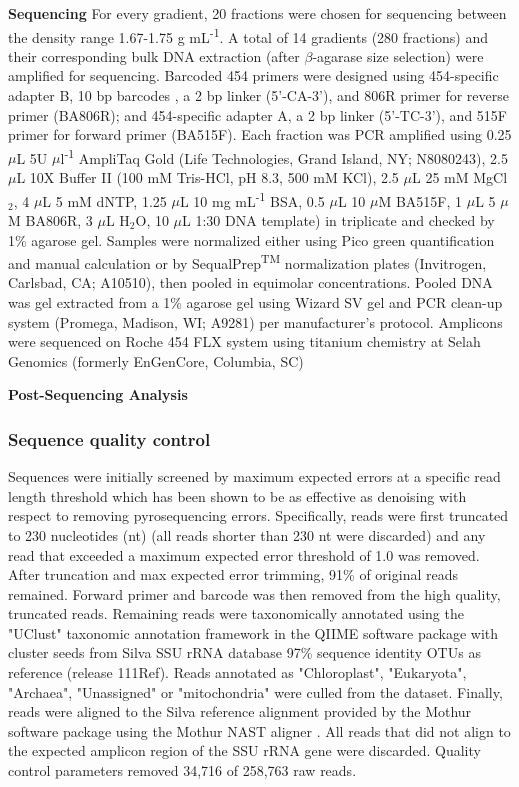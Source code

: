 \textbf{Sequencing}  For every gradient, 20 fractions were chosen for sequencing between the density range 1.67-1.75 g mL\textsuperscript{-1}. A total of 14 gradients (280 fractions) and their corresponding bulk DNA extraction (after $\beta$-agarase size selection) were amplified for sequencing. Barcoded 454 primers were designed using 454-specific adapter B, 10 bp barcodes \cite{Hamady_2008}, a 2 bp linker (5'-CA-3'), and 806R primer for reverse primer (BA806R); and 454-specific adapter A, a 2 bp linker (5'-TC-3'), and 515F primer for forward primer (BA515F). Each fraction was PCR amplified using 0.25 $\mu$L 5U $\mu$l\textsuperscript{-1} AmpliTaq Gold (Life Technologies, Grand Island, NY; N8080243), 2.5 $\mu$L 10X Buffer II (100 mM Tris-HCl, pH 8.3, 500 mM KCl), 2.5 $\mu$L 25 mM MgCl$_{2}$, 4 $\mu$L 5 mM dNTP, 1.25 $\mu$L 10 mg mL\textsuperscript{-1} BSA, 0.5 $\mu$L 10 $\mu$M BA515F, 1 $\mu$L 5 $\mu$M BA806R, 3 $\mu$L H$_{2}$O, 10 $\mu$L 1:30 DNA template) in triplicate and checked by 1\% agarose gel. Samples were normalized either using Pico green quantification and manual calculation or by SequalPrep\textsuperscript{TM} normalization plates (Invitrogen, Carlsbad, CA; A10510), then pooled in equimolar concentrations. Pooled DNA was gel extracted from a 1\% agarose gel using Wizard SV gel and PCR clean-up system (Promega, Madison, WI; A9281) per manufacturer's protocol.  Amplicons were sequenced on Roche 454 FLX system using titanium chemistry at Selah Genomics (formerly EnGenCore, Columbia, SC)    

\textbf{Post-Sequencing Analysis}
\subsubsection{Sequence quality control}
Sequences were initially screened by maximum expected errors at a specific read
length threshold \citep{23955772} which has been shown to be as effective as
denoising with respect to removing pyrosequencing errors. Specifically, reads
were first truncated to 230 nucleotides (nt) (all reads shorter than 230 nt
were discarded) and any read that exceeded a maximum expected error threshold
of 1.0 was removed. After truncation and max expected error trimming, 91\% of
original reads remained. Forward primer and barcode was then removed from the
high quality, truncated reads.  Remaining reads were taxonomically annotated
using the "UClust" taxonomic annotation framework in the QIIME software package
\citep{20383131, 20709691} with cluster seeds from Silva SSU rRNA database
\citep{17947321} 97\% sequence identity OTUs as reference (release 111Ref).
Reads annotated as "Chloroplast", "Eukaryota", "Archaea", "Unassigned" or
"mitochondria" were culled from the dataset. Finally, reads were aligned to the
Silva reference alignment provided by the Mothur software package
\citep{19801464} using the Mothur NAST aligner \citep{16845035}. All reads that
did not align to the expected amplicon region of the SSU rRNA gene were
discarded. Quality control parameters removed 34,716 of 258,763 raw reads.


